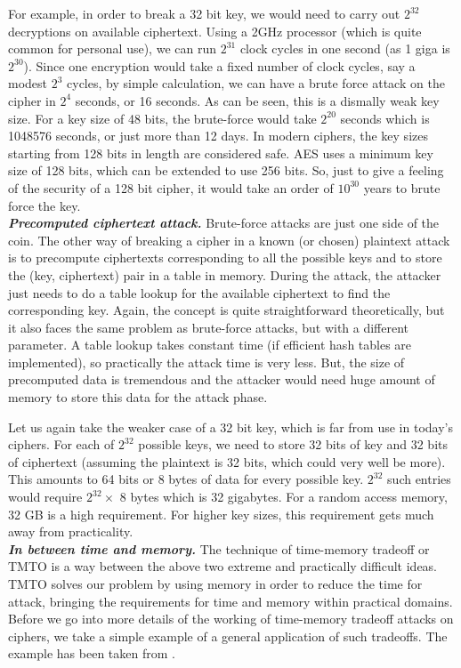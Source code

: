 For example, in order to break a 32 bit key, we would need to carry out $2^{32}$ decryptions on available ciphertext. Using a 2GHz processor (which is quite common for personal use), we can run $2^{31}$ clock cycles in one second (as 1 giga is $2^{30}$). Since one encryption would take a fixed number of clock cycles, say a modest $2^3$ cycles, by simple calculation, we can have a brute force attack on the cipher in $2^4$ seconds, or 16 seconds. As can be seen, this is a dismally weak key size. For a key size of 48 bits, the brute-force would take $2^{20}$ seconds which is 1048576 seconds, or just more than 12 days. In modern ciphers, the key sizes starting from 128 bits in length are considered safe. AES uses a minimum key size of 128 bits, which can be extended to use 256 bits. So, just to give a feeling of the security of a 128 bit cipher, it would take an order of $10^{30}$ years to brute force the key.\\

\noindent \textit{\textbf{Precomputed ciphertext attack.}} Brute-force attacks are just one side of the coin. The other way of breaking a cipher in a known (or chosen) plaintext attack is to precompute ciphertexts corresponding to all the possible keys and to store the (key, ciphertext) pair in a table in memory. During the attack, the attacker just needs to do a table lookup for the available ciphertext to find the corresponding key. Again, the concept is quite straightforward theoretically, but it also faces the same problem as brute-force attacks, but with a different parameter. A table lookup takes constant time (if efficient hash tables are implemented), so practically the attack time is very less. But, the size of precomputed data is tremendous and the attacker would need huge amount of memory to store this data for the attack phase. 

Let us again take the weaker case of a 32 bit key, which is far from use in today's ciphers. For each of $2^{32}$ possible keys, we need to store 32 bits of key and 32 bits of ciphertext (assuming the plaintext is 32 bits, which could very well be more). This amounts to 64 bits or 8 bytes of data for every possible key. $2^{32}$ such entries would require $2^{32} \times$ 8 bytes which is 32 gigabytes. For a random access memory, 32 GB is a high requirement. For higher key sizes, this requirement gets much away from practicality.\\

\noindent \textit{\textbf{In between time and memory.}} The technique of time-memory tradeoff or TMTO is a way between the above two extreme and practically difficult ideas. TMTO solves our problem by using memory in order to reduce the time for attack, bringing the requirements for time and memory within  practical domains. Before we go into more details of the working of time-memory tradeoff attacks on ciphers, we take a simple example of a general application of such tradeoffs. The example has been taken from \cite{stamp2003out}. \\


